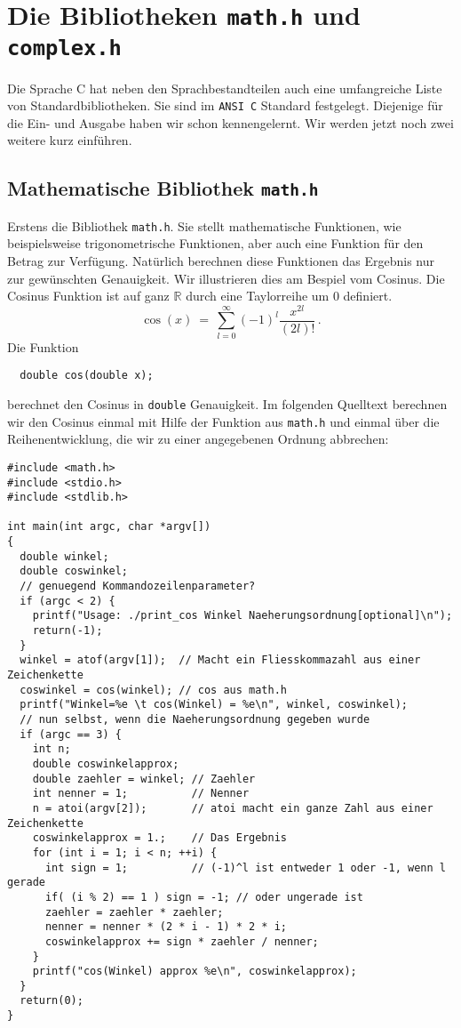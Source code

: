 \section{Die Bibliotheken \texttt{math.h} und \texttt{complex.h}}

Die Sprache C hat neben den Sprachbestandteilen auch eine umfangreiche Liste von Standardbibliotheken.
Sie sind im \texttt{ANSI C} Standard festgelegt.
Diejenige für die Ein- und Ausgabe haben wir schon kennengelernt.
Wir werden jetzt noch zwei weitere kurz einführen.

\subsection{Mathematische Bibliothek \texttt{math.h}}

Erstens die Bibliothek \texttt{math.h}.
Sie stellt mathematische Funktionen, wie beispielsweise trigonometrische Funktionen, aber auch eine Funktion für den Betrag zur Verfügung.
Natürlich berechnen diese Funktionen das Ergebnis nur zur gewünschten Genauigkeit.
Wir illustrieren dies am Bespiel vom Cosinus.
Die Cosinus Funktion ist auf ganz $\mathbb{R}$ durch eine Taylorreihe um 0 definiert.
\begin{equation}
  \cos\left(x\right)\ =\ \sum_{l=0}^{\infty} \left(-1\right)^{l} \dfrac{x^{2l}}{\left(2l\right)!}\,.
\end{equation}
Die Funktion 
\begin{lstlisting}
  double cos(double x);
\end{lstlisting}
berechnet den Cosinus in \texttt{double} Genauigkeit.
Im folgenden Quelltext berechnen wir den Cosinus einmal mit Hilfe der Funktion aus \texttt{math.h} und einmal über die Reihenentwicklung, die wir zu einer angegebenen Ordnung abbrechen:
\begin{lstlisting}[caption={Beispiel zur Verwendung des Cosinus}, belowcaptionskip=0.3em]
#include <math.h>
#include <stdio.h>
#include <stdlib.h>

int main(int argc, char *argv[])
{
  double winkel;
  double coswinkel;
  // genuegend Kommandozeilenparameter?
  if (argc < 2) {
    printf("Usage: ./print_cos Winkel Naeherungsordnung[optional]\n");
    return(-1);
  }
  winkel = atof(argv[1]);  // Macht ein Fliesskommazahl aus einer Zeichenkette
  coswinkel = cos(winkel); // cos aus math.h
  printf("Winkel=%e \t cos(Winkel) = %e\n", winkel, coswinkel);
  // nun selbst, wenn die Naeherungsordnung gegeben wurde
  if (argc == 3) {
    int n;
    double coswinkelapprox;
    double zaehler = winkel; // Zaehler
    int nenner = 1;          // Nenner
    n = atoi(argv[2]);       // atoi macht ein ganze Zahl aus einer Zeichenkette
    coswinkelapprox = 1.;    // Das Ergebnis
    for (int i = 1; i < n; ++i) {
      int sign = 1;          // (-1)^l ist entweder 1 oder -1, wenn l gerade
      if( (i % 2) == 1 ) sign = -1; // oder ungerade ist
      zaehler = zaehler * zaehler;
      nenner = nenner * (2 * i - 1) * 2 * i;
      coswinkelapprox += sign * zaehler / nenner;
    }
    printf("cos(Winkel) approx %e\n", coswinkelapprox);
  }
  return(0);
}
\end{lstlisting}
